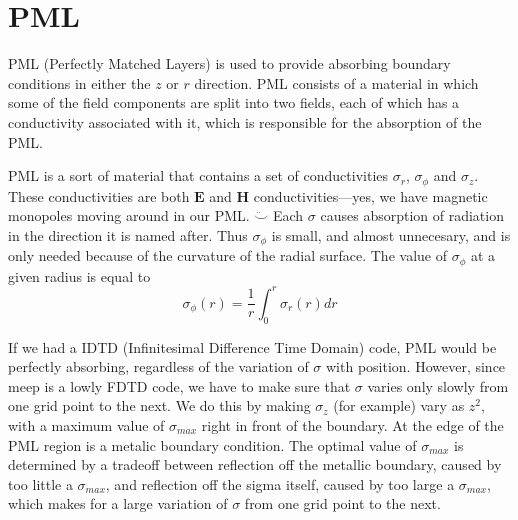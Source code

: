\documentclass[floats]{book}
\begin{document}
\chapter{PML}

PML (Perfectly Matched Layers) is used to provide absorbing boundary
conditions in either the $z$ or $r$ direction.  PML consists of a material
in which some of the field components are split into two fields, each of
which has a conductivity associated with it, which is responsible for the
absorption of the PML.

PML is a sort of material that contains a set of conductivities $\sigma_r$,
$\sigma_\phi$ and $\sigma_z$.  These conductivities are both $\mathbf{E}$
and $\mathbf{H}$ conductivities---yes, we have magnetic monopoles moving
around in our PML.  $\ddot\smile$ Each $\sigma$ causes absorption of
radiation in the direction it is named after.  Thus $\sigma_\phi$ is small,
and almost unnecesary, and is only needed because of the curvature of the
radial surface.  The value of $\sigma_\phi$ at a given radius is equal to
\begin{equation}
\sigma_\phi(r) = \frac1r \int_0^r \sigma_r(r)dr
\end{equation}

If we had a IDTD (Infinitesimal Difference Time Domain) code, PML would be
perfectly absorbing, regardless of the variation of $\sigma$ with position.
However, since meep is a lowly FDTD code, we have to make sure that
$\sigma$ varies only slowly from one grid point to the next.  We do this by
making $\sigma_z$ (for example) vary as $z^2$, with a maximum value of
$\sigma_{max}$ right in front of the boundary.  At the edge of the PML
region is a metalic boundary condition.  The optimal value of
$\sigma_{max}$ is determined by a tradeoff between reflection off the
metallic boundary, caused by too little a $\sigma_{max}$, and reflection
off the sigma itself, caused by too large a $\sigma_{max}$, which makes for
a large variation of $\sigma$ from one grid point to the next.
\end{document}
